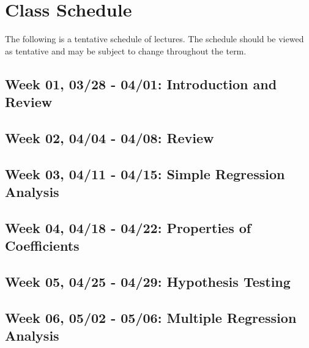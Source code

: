 \documentclass[11pt,]{article}
\begin{document}
\newpage

\hypertarget{class-schedule}{%
\section{Class Schedule}\label{class-schedule}}

The following is a tentative schedule of lectures. The schedule should
be viewed as tentative and may be subject to change throughout the term.

\hypertarget{week-01-0328---0401-introduction-and-review}{%
\subsection{Week 01, 03/28 - 04/01: Introduction and
Review}\label{week-01-0328---0401-introduction-and-review}}

\hypertarget{week-02-0404---0408-review}{%
\subsection{Week 02, 04/04 - 04/08:
Review}\label{week-02-0404---0408-review}}

\hypertarget{week-03-0411---0415-simple-regression-analysis}{%
\subsection{Week 03, 04/11 - 04/15: Simple Regression
Analysis}\label{week-03-0411---0415-simple-regression-analysis}}

\hypertarget{week-04-0418---0422-properties-of-coefficients}{%
\subsection{Week 04, 04/18 - 04/22: Properties of
Coefficients}\label{week-04-0418---0422-properties-of-coefficients}}

\hypertarget{week-05-0425---0429-hypothesis-testing}{%
\subsection{Week 05, 04/25 - 04/29: Hypothesis
Testing}\label{week-05-0425---0429-hypothesis-testing}}

\hypertarget{week-06-0502---0506-multiple-regression-analysis}{%
\subsection{Week 06, 05/02 - 05/06: Multiple Regression
Analysis}\label{week-06-0502---0506-multiple-regression-analysis}}
\end{document}
